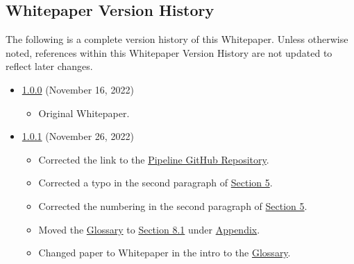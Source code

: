 \documentclass[class=article, crop=false]{standalone}
\begin{document}
\subsection{Whitepaper Version History}
The following is a complete version history of this Whitepaper. Unless otherwise noted, references within this Whitepaper Version History are not updated to reflect later changes.

\begin{itemize}[topsep=0pt, itemsep=3pt,leftmargin=16pt]
    \item \href{https://github.com/BeanstalkFarms/Pipeline-Whitepaper/blob/master/version-history/pipeline1_0_0.pdf}{1.0.0} (November 16, 2022)
    \begin{itemize}
        \item Original Whitepaper.
    \end{itemize}
    \item \href{https://evmpipeline.org/pipeline.pdf}{1.0.1} (November 26, 2022)
    \begin{itemize}
        \item Corrected the link to the \href{https://github.com/BeanstalkFarms/Pipeline}{Pipeline GitHub Repository}.
        \item Corrected a typo in the second paragraph of \hyperlink{section.5}{Section 5}.
        \item Corrected the numbering in the second paragraph of \hyperlink{section.5}{Section 5}.
        \item Moved the \hyperlink{subsection.8.1}{Glossary} to \hyperlink{subsection.8.1}{Section 8.1} under \hyperlink{section.8}{Appendix}.
        \item Changed paper to Whitepaper in the intro to the \hyperlink{subsection.8.1}{Glossary}.
    \end{itemize}
    
\end{itemize}
\end{document}
